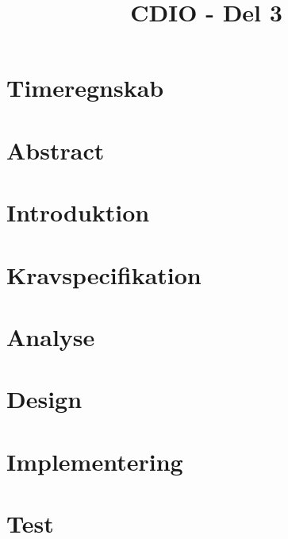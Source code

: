 \documentclass[12pt,oneside,a4paper,english]{article}
\title{CDIO - Del 3} %
\begin{document}


\newpage
\doublespacing
\renewcommand{\baselinestretch}{1}\normalsize
\tableofcontents
\renewcommand{\baselinestretch}{1}\normalsize
\thispagestyle{fancy} %

\newpage
\section{Timeregnskab}

\thispagestyle{fancy}

\newpage
\section{Abstract}

\thispagestyle{fancy}

\newpage
\section{Introduktion}

\thispagestyle{fancy}

\newpage
\section{Kravspecifikation}

\thispagestyle{fancy}

\newpage
\section{Analyse}

\thispagestyle{fancy}

\newpage
\section{Design}

\thispagestyle{fancy}

\newpage
\section{Implementering}

\thispagestyle{fancy}

\newpage
\section{Test}

\thispagestyle{fancy}
\end{document}
